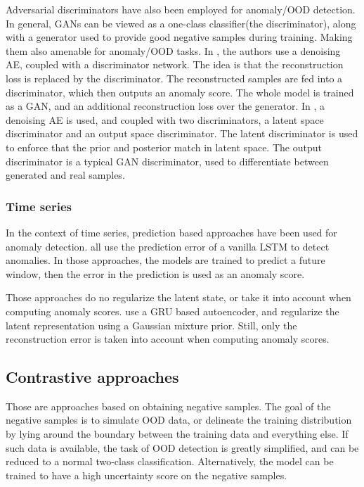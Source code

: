 \documentclass[../main.tex]{subfiles}
\begin{document}
Adversarial discriminators have also been employed for anomaly/OOD detection. In general, GANs can be viewed as a one-class classifier(the discriminator), along with a generator used to provide good negative samples during training. Making them also amenable for anomaly/OOD tasks.
In \citep{sabokrou2018adversarially}, the authors use a denoising AE, coupled with a discriminator network. The idea is that the reconstruction loss is replaced by the discriminator. The reconstructed samples are fed into a discriminator, which then outputs an anomaly score. The whole model is trained as a GAN, and an additional reconstruction loss over the generator. In \citep{perera2019ocgan}, a denoising AE is used, and coupled with two discriminators, a latent space discriminator and an output space discriminator. The latent discriminator is used to enforce that the prior and posterior match in latent space. The output discriminator is a typical GAN discriminator, used to differentiate between generated and real samples.  

\subsubsection{Time series}

In the context of time series, prediction based approaches have been used for anomaly detection. \citep{hundman2018detecting, taylor2016anomaly, malhotra2015long, marchi2015non} all use the prediction error of a vanilla LSTM to detect anomalies. 
In those approaches, the models are trained to predict a future window, then the error in the prediction is used as an anomaly score. 

Those approaches do no regularize the latent state, or take it into account when computing anomaly scores. \citet{guo2018multidimensional} use a GRU based autoencoder, and regularize the latent representation using a Gaussian mixture prior. Still, only the reconstruction error is taken into account when computing anomaly scores.


\subsection{Contrastive approaches}
Those are approaches based on obtaining negative samples. The goal of the negative samples is to simulate OOD data, or delineate the training distribution by lying around the boundary between the training data and everything else. 
If such data is available, the task of OOD detection is greatly simplified, and can be reduced to a normal two-class classification. Alternatively, the model can be trained to have a high uncertainty score on the negative samples. 
\end{document}
